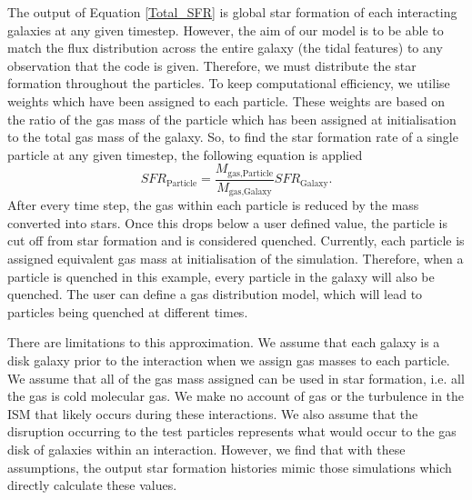 The output of Equation \ref{Total_SFR} is global star formation of each interacting galaxies at any given timestep. However, the aim of our model is to be able to match the flux distribution across the entire galaxy (\DIFdelbegin {}\DIFdelend \DIFaddbegin {}\DIFaddend the tidal features) to any observation that the code is given. Therefore, we must distribute the star formation throughout the particles. To keep computational efficiency, we utilise weights which have been assigned to each particle. These weights are based on the ratio of the gas mass of the particle which has been assigned at initialisation to the total gas mass of the galaxy. So, to find the star formation rate of a single particle at any given timestep, the following equation is applied\DIFdelbegin \DIFdel{,
}\DIFdelend \DIFaddbegin \DIFadd{:
}\DIFaddend \begin{equation}
SFR_{\text{Particle}} = \frac{M_{\text{gas,Particle}}}{M_{\text{gas,Galaxy}}}SFR_{\text{Galaxy}}.
\end{equation}
After every time step, the gas within each particle is reduced by the mass converted into stars. Once this drops below a user defined value, the particle is cut off from star formation and is considered quenched. Currently, each particle is assigned equivalent gas mass at initialisation of the simulation. Therefore, when a particle is quenched in this example, every particle in the galaxy will also be quenched. The user can define a gas distribution model, which will lead to particles being quenched at different times.

There are limitations to this approximation. We assume that each galaxy is a disk galaxy prior to the interaction when we assign gas masses to each particle. We assume that all of the gas mass assigned can be used in star formation, i.e. all the gas is cold molecular gas. We make no account of gas \DIFdelbegin {}\DIFdelend \DIFaddbegin {}\DIFaddend or the turbulence in the ISM that likely occurs during these interactions. We also assume that the disruption occurring to the test particles represents what would occur to the gas disk of galaxies within an interaction. However, we find that with these assumptions, the output star formation histories mimic those simulations which directly calculate these values. 

